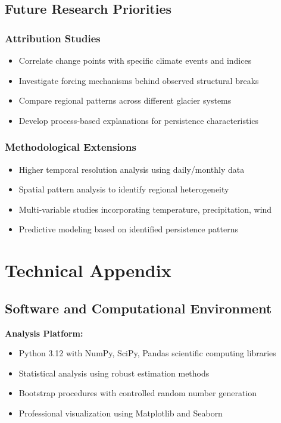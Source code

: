 \documentclass[12pt,a4paper]{article}
\begin{document}
\subsection{Future Research Priorities}

\subsubsection{Attribution Studies}
\begin{itemize}
    \item Correlate change points with specific climate events and indices
    \item Investigate forcing mechanisms behind observed structural breaks
    \item Compare regional patterns across different glacier systems
    \item Develop process-based explanations for persistence characteristics
\end{itemize}

\subsubsection{Methodological Extensions}
\begin{itemize}
    \item Higher temporal resolution analysis using daily/monthly data
    \item Spatial pattern analysis to identify regional heterogeneity
    \item Multi-variable studies incorporating temperature, precipitation, wind
    \item Predictive modeling based on identified persistence patterns
\end{itemize}

\section{Technical Appendix}

\subsection{Software and Computational Environment}

\textbf{Analysis Platform:}
\begin{itemize}
    \item Python 3.12 with NumPy, SciPy, Pandas scientific computing libraries
    \item Statistical analysis using robust estimation methods
    \item Bootstrap procedures with controlled random number generation
    \item Professional visualization using Matplotlib and Seaborn
\end{itemize}
\end{document}
